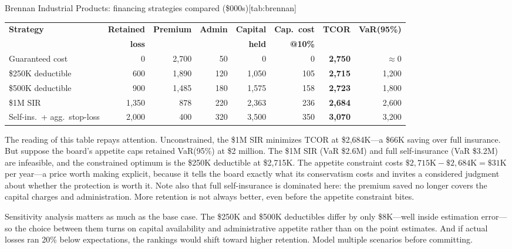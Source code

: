 \documentclass[11pt,openany]{book}
\begin{document}
\begin{ermtable}{Brennan Industrial Products: financing strategies compared
(\$000s)}[tab:brennan]
\small
\setlength{\tabcolsep}{4pt}
\begin{tabular}{@{}lrrrrrrr@{}}
\toprule
\textbf{Strategy} & \textbf{Retained} & \textbf{Premium} & \textbf{Admin} &
\textbf{Capital} & \textbf{Cap.\ cost} & \textbf{TCOR} & \textbf{VaR(95\%)} \\
 & \textbf{loss} & & & \textbf{held} & \textbf{@10\%} & & \\
\midrule
Guaranteed cost & 0 & 2{,}700 & 50 & 0 & 0 & \textbf{2{,}750} & \(\approx 0\) \\
\$250K deductible & 600 & 1{,}890 & 120 & 1{,}050 & 105 & \textbf{2{,}715} & 1{,}200 \\
\$500K deductible & 900 & 1{,}485 & 180 & 1{,}575 & 158 & \textbf{2{,}723} & 1{,}800 \\
\$1M SIR & 1{,}350 & 878 & 220 & 2{,}363 & 236 & \textbf{2{,}684} & 2{,}600 \\
Self-ins.\ + agg.\ stop-loss & 2{,}000 & 400 & 320 & 3{,}500 & 350 &
\textbf{3{,}070} & 3{,}200 \\
\bottomrule
\end{tabular}
\end{ermtable}

The reading of this table repays attention. Unconstrained, the \$1M SIR
minimizes TCOR at \$2,684K---a \$66K saving over full insurance. But suppose
the board's appetite caps retained VaR(95\%) at \$2 million. The \$1M SIR
(VaR \$2.6M) and full self-insurance (VaR \$3.2M) are infeasible, and the
constrained optimum is the \$250K deductible at \$2,715K. The appetite
constraint costs \(\$2{,}715\text{K} - \$2{,}684\text{K} = \$31\text{K}\) per
year---a price worth making explicit, because it tells the board exactly what
its conservatism costs and invites a considered judgment about whether the
protection is worth it. Note also that full self-insurance is dominated here:
the premium saved no longer covers the capital charges and administration.
More retention is not always better, even before the appetite constraint
bites.

Sensitivity analysis matters as much as the base case. The \$250K and \$500K
deductibles differ by only \$8K---well inside estimation error---so the
choice between them turns on capital availability and administrative appetite
rather than on the point estimates. And if actual losses ran 20\% below
expectations, the rankings would shift toward higher retention. Model
multiple scenarios before committing.
\end{document}
